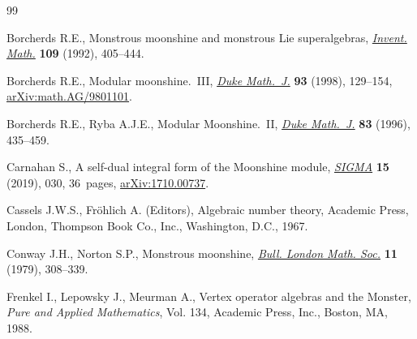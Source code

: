 \begin{thebibliography}{99}
\footnotesize\itemsep=0pt

Borcherds R.E., Monstrous moonshine and monstrous {L}ie superalgebras,
 \href{https://doi.org/10.1007/BF01232032}{\textit{Invent. Math.}} \textbf{109} (1992), 405--444.

Borcherds R.E., Modular moonshine.~{III}, \href{https://doi.org/10.1215/S0012-7094-98-09305-X}{\textit{Duke Math.~J.}} \textbf{93}
 (1998), 129--154, \href{https://arxiv.org/abs/math.AG/9801101}{arXiv:math.AG/9801101}.

Borcherds R.E., Ryba A.J.E., Modular {M}oonshine.~{II}, \href{https://doi.org/10.1215/S0012-7094-96-08315-5}{\textit{Duke Math.~J.}}
 \textbf{83} (1996), 435--459.

Carnahan S., A self-dual integral form of the {M}oonshine module,
 \href{https://doi.org/10.3842/SIGMA.2019.030}{\textit{SIGMA}} \textbf{15} (2019), 030, 36~pages, \href{https://arxiv.org/abs/1710.00737}{arXiv:1710.00737}.

Cassels J.W.S., Fr\"ohlich A. (Editors), Algebraic number theory, Academic
 Press, London, Thompson Book Co., Inc., Washington, D.C., 1967.

Conway J.H., Norton S.P., Monstrous moonshine, \href{https://doi.org/10.1112/blms/11.3.308}{\textit{Bull. London Math. Soc.}}
 \textbf{11} (1979), 308--339.

Frenkel I., Lepowsky J., Meurman A., Vertex operator algebras and the
 {M}onster, \textit{Pure and Applied Mathematics}, Vol. 134, Academic Press,
 Inc., Boston, MA, 1988.

\end{thebibliography}
